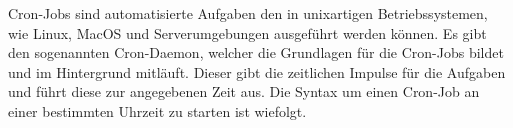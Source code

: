 Cron-Jobs sind automatisierte Aufgaben den in unixartigen Betriebssystemen, wie Linux, MacOS und Serverumgebungen ausgeführt werden können. Es gibt den sogenannten Cron-Daemon, welcher die Grundlagen für die Cron-Jobs bildet und im Hintergrund mitläuft. Dieser gibt die zeitlichen Impulse für die Aufgaben und führt diese zur angegebenen Zeit aus. Die Syntax um einen Cron-Job an einer bestimmten Uhrzeit zu starten ist wiefolgt.

